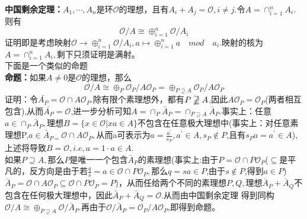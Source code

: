 \documentclass[UTF8]{article}
\begin{document}
 
 
 
    \textbf{中国剩余定理：}$A_{1},\cdots,A_{n}$是环$\mathcal{O}$的理想，且有$A_{i}+A_{j}=\mathcal{O},i\neq j$.令$A=\cap_{i=1}^{n}A_{i}$.则有
    $$
    \mathcal{O}/A\cong \oplus_{i=1}^{n}\mathcal{O}/A_{i}
    $$
    证明即是考虑映射$\mathcal{O}\rightarrow\oplus_{i=1}^{n}\mathcal{O}/A_{i},a\mapsto \oplus_{i=1}^{n}a\quad mod \quad a_{i}. $映射的核为$A=\cap_{i=1}^{n}A_{i},$剩下只须证明是满射。\\
    下面是一个类似的命题\\
    \textbf{命题：}如果$A\neq 0$是$\mathcal{O}$的理想，那么$$
    \mathcal{O}/A\cong \oplus_{P}\mathcal{O}_{P}/A\mathcal{O}_{P}=\oplus_{P\supseteq A}\mathcal{O}_{P}/A\mathcal{O}_{P}
    $$
    证明：令$\bar{A_{P}}=\mathcal{O}\cap A\mathcal{O}_{P}.$除有限个素理想外，都有$P\nsupseteqq A$,因此$A\mathcal{O}_{P}=\mathcal{O}_{P}$(两者相互包含),从而$\bar{A_{P}}=\mathcal{O}$,进一步分析可知$A=\cap_{P}\bar{A}_{P}=\cap_{P\supseteq A}\bar{A}_{P}.$事实上：任意$a\in \cap_{P}\bar{A}_{P},$理想$B=\{x\in \mathcal{O}|xa\in A\} $不包含在任意极大理想中(事实上：对任意素理想P,$a\in \bar{A}_{P=}\mathcal{O}\cap A\mathcal{O}_{P},$从而a可表示为$a=\frac{a^{'}}{s_{P}},a^{'}\in A,s_{P}\notin P$,且有$s_{P}a=a^{'}\in A$),上述将导致$B=\mathcal{O},i.e,a=1\cdot a\in A$.\\
    如果$P\supseteq A,$那么$P$是唯一一个包含$\bar{A}_{P}$的素理想(事实上:由于$P=\mathcal{O}\cap P\mathcal{O}_{P}$($\subseteq $是平凡的，反方向是由于若$\frac{q}{s}=a\in \mathcal{O}\cap P\mathcal{O}_{P},$那么$q=sa\in P$,由于$s\notin P$,得到$a\in P$)$\bar{A}_{P}=\mathcal{O}\cap A\mathcal{O}_{P}\subseteq \mathcal{O}\cap P\mathcal{O}_{P}=P$)，从而任给两个不同的素理想$P,Q,$理想$\bar{A}_{P}+\bar{A}_{Q}$不包含在任何极大理想中，因此$\bar{A}_{P}+\bar{A}_{Q}=\mathcal{O}.$从而由中国剩余定理
    得到同构$\mathcal{O}/A\cong \oplus_{P\supseteq A}\mathcal{O}/\bar{A}_{P}.$再由于$\mathcal{O}/\bar{A}_{P}=\mathcal{O}_{P}/A\mathcal{O}_{P}$,即得到命题。
    
\end{document}
